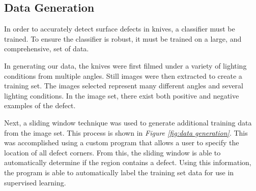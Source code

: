 \documentclass[letterpaper, 10 pt, conference]{ieeeconf}  %
\begin{document}
\subsection{Data Generation}

In order to accurately detect surface defects in knives, a classifier must be trained. To ensure the classifier is robust, it must be trained on a large, and comprehensive, set of data.

In generating our data, the knives were first filmed under a variety of lighting conditions from multiple angles. Still images were then extracted to create a training set. The images selected represent many different angles and several lighting conditions. In the image set, there exist both positive and negative examples of the defect.

Next, a sliding window technique was used to generate additional training data from the image set. This process is shown in \textit{Figure \ref{fig:data generation}}. This was accomplished using a custom program that allows a user to specify the location of all defect corners. From this, the sliding window is able to automatically determine if the region contains a defect. Using this information, the program is able to automatically label the training set data for use in supervised learning.
\end{document}

